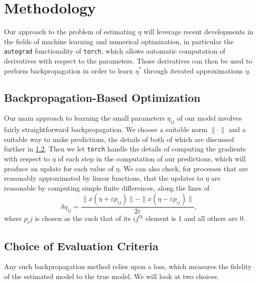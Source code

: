 \documentclass[12pt]{article}
\begin{document}




\section{Methodology}\label{methodology}


Our approach to the problem of estimating $\eta$ will leverage recent developments in the fields of machine learning and numerical optimization, in particular the \texttt{autograd} functionality of \texttt{torch}, which allows automatic computation of derivatives with respect to the parameters.\cite{biggs} Those derivatives can then be used to perform backpropagation in order to learn $\eta^*$ through iterated approximations $\eta$.



\subsection{Backpropagation-Based Optimization}

Our main approach to learning the small parameters $\eta_{ij}$ of our model involves fairly straightforward backpropagation. We choose a suitable norm $\|\cdot\|$ and a suitable way to make predictions, the details of both of which are discussed further in \ref{norms}. Then we let \texttt{torch} handle the details of computing the gradients with respect to $\eta$ of each step in the computation of our predictions, which will produce an update for each value of $\eta$. We can also check, for processes that are reasonably approximated by linear functions, that the updates to $\eta$ are reasonable by computing simple finite differences, along the lines of $$\delta\eta_{ij} = \frac{ \| x(\eta + \varepsilon p_{ij}) \| - \| x(\eta - \varepsilon p_{ij}) \| }{2 \varepsilon},$$ where $p_ij$ is chosen as the such that of its $ij^{th}$ element is $1$ and all others are $0$.



\subsection{Choice of Evaluation Criteria}\label{norms}

Any such backpropagation method relies upon a loss, which measures the fidelity of the estimated model to the true model. We will look at two choices.
\end{document}
